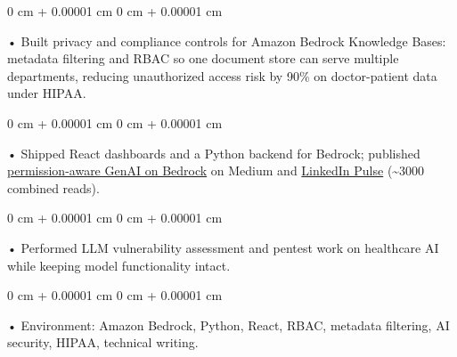 \documentclass[10pt, letterpaper]{article}
\newenvironment{onecolentry}{
    \begin{adjustwidth}{
        0 cm + 0.00001 cm
    }{
        0 cm + 0.00001 cm
    }
}{
    \end{adjustwidth}
} %
\begin{document}
        \begin{onecolentry}
             • Built privacy and compliance controls for Amazon Bedrock Knowledge Bases: metadata filtering and RBAC so one document store can serve multiple departments, reducing unauthorized access risk by 90\% on doctor-patient data under HIPAA.
        \end{onecolentry}
        \begin{onecolentry}
             • Shipped React dashboards and a Python backend for Bedrock; published \href{https://medium.com/@sreenikethaathreya/building-a-permission-aware-genai-application-on-amazon-bedrock-8fdc2410dd43}{permission-aware GenAI on Bedrock} on Medium and \href{https://www.linkedin.com/pulse/building-permission-aware-genai-application-amazon-bedrock-aathreya-g7nme/}{LinkedIn Pulse} (\textasciitilde 3000 combined reads).
        \end{onecolentry}
        \begin{onecolentry}
             • Performed LLM vulnerability assessment and pentest work on healthcare AI while keeping model functionality intact.
        \end{onecolentry}
        \begin{onecolentry}
             • Environment: Amazon Bedrock, Python, React, RBAC, metadata filtering, AI security, HIPAA, technical writing.

        \end{onecolentry}
\end{document}
